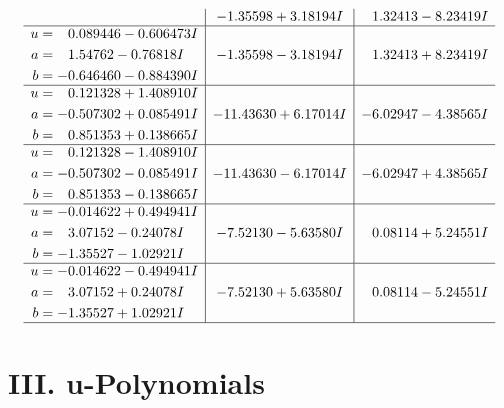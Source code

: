 \documentclass[1p]{elsarticle_modified}
\theoremstyle{definition}
\begin{document}
$$\begin{array}{c|c|c}
 & -1.35598 + 3.18194 I & \phantom{-}1.32413 - 8.23419 I \\ \hline\begin{aligned}
u &= \phantom{-}0.089446 - 0.606473 I \\
a &= \phantom{-}1.54762 - 0.76818 I \\
b &= -0.646460 - 0.884390 I\end{aligned}
 & -1.35598 - 3.18194 I & \phantom{-}1.32413 + 8.23419 I \\ \hline\begin{aligned}
u &= \phantom{-}0.121328 + 1.408910 I \\
a &= -0.507302 + 0.085491 I \\
b &= \phantom{-}0.851353 + 0.138665 I\end{aligned}
 & -11.43630 + 6.17014 I & -6.02947 - 4.38565 I \\ \hline\begin{aligned}
u &= \phantom{-}0.121328 - 1.408910 I \\
a &= -0.507302 - 0.085491 I \\
b &= \phantom{-}0.851353 - 0.138665 I\end{aligned}
 & -11.43630 - 6.17014 I & -6.02947 + 4.38565 I \\ \hline\begin{aligned}
u &= -0.014622 + 0.494941 I \\
a &= \phantom{-}3.07152 - 0.24078 I \\
b &= -1.35527 - 1.02921 I\end{aligned}
 & -7.52130 - 5.63580 I & \phantom{-}0.08114 + 5.24551 I \\ \hline\begin{aligned}
u &= -0.014622 - 0.494941 I \\
a &= \phantom{-}3.07152 + 0.24078 I \\
b &= -1.35527 + 1.02921 I\end{aligned}
 & -7.52130 + 5.63580 I & \phantom{-}0.08114 - 5.24551 I\\
 \hline 
 \end{array}$$\newpage
\newpage\renewcommand{\arraystretch}{1}
\centering \section*{ III. u-Polynomials}
\end{document}
